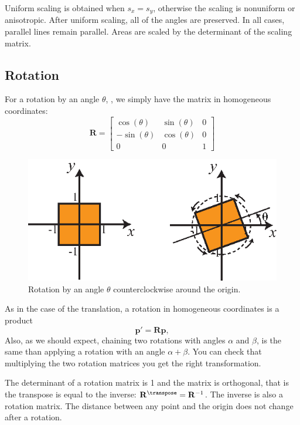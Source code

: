 Uniform scaling is obtained when $s_x=s_y$, otherwise the scaling is nonuniform or anisotropic. After uniform scaling, all of the angles are preserved. In all cases, parallel lines remain parallel. Areas are scaled by the determinant of the scaling matrix.


\subsection{Rotation}

For a rotation by an angle $\theta$, \fig{\ref{fig:rotation}}, we simply have the matrix in homogeneous coordinates:
\begin{equation}
    \mathbf{R} =             
    \begin{bmatrix}
    \cos(\theta) & \sin(\theta) & 0 \\
    -\sin(\theta) & \cos(\theta) & 0 \\
    0 & 0 & 1
    \end{bmatrix}
\end{equation}


\begin{figure}
\centerline{
\includegraphics[width=.6\linewidth]{figures/imaging_geometry/rotation.eps}
}
\caption{Rotation by an angle $\theta$ counterclockwise around the origin.}
\label{fig:rotation}
\end{figure}


As in the case of the translation, a rotation in homogeneous coordinates is a product
\begin{equation}
    \mathbf{p}' = \mathbf{R} \mathbf{p},
\end{equation}
Also, as we should expect, chaining two rotations with angles $\alpha$ and $\beta$, is the same than applying a rotation with an angle $\alpha+\beta$. You can check that multiplying the two rotation matrices you get the right transformation. 

The determinant of a rotation matrix is 1 and the matrix is orthogonal, that is the transpose is equal to the inverse: $\mathbf{R}^\transpose = \mathbf{R}^{-1}$. The inverse is also a rotation matrix. The distance between any point and the origin does not change after a rotation. 

